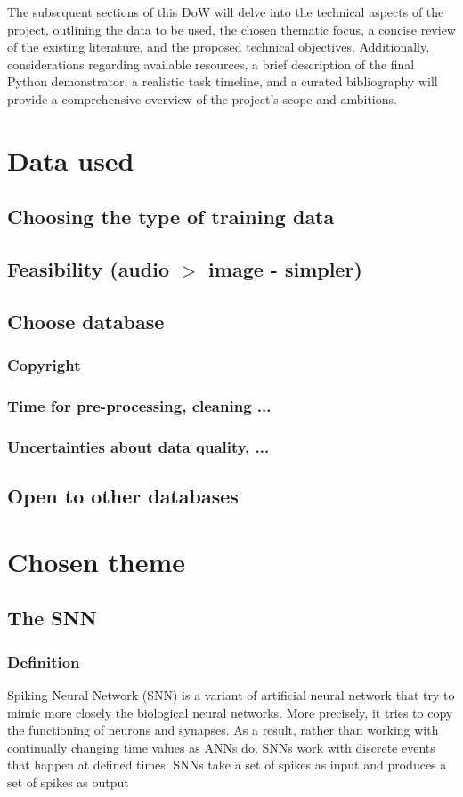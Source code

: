 \documentclass[11pt]{article}
\begin{document}
The subsequent sections of this DoW will delve into the technical aspects of the project, outlining the data to be used, the chosen thematic focus, a concise review of the existing literature, and the proposed technical objectives. Additionally, considerations regarding available resources, a brief description of the final Python demonstrator, a realistic task timeline, and a curated bibliography will provide a comprehensive overview of the project's scope and ambitions.

\section{Data used}
\subsection{Choosing the type of training data}
\subsection{Feasibility (audio $>$ image - simpler)}
\subsection{Choose database}
\subsubsection{Copyright}
\subsubsection{Time for pre-processing, cleaning ...}
\subsubsection{Uncertainties about data quality, ...}
\subsection{Open to other databases}

\section{Chosen theme}
\subsection{The SNN}
\subsubsection{Definition}
Spiking Neural Network (SNN) is a variant of artificial neural network that try to mimic more closely the biological neural networks. More precisely, it tries to copy the functioning of neurons and synapses. As a result, rather than working with continually changing time values as ANNs do, SNNs work with discrete events that happen at defined times. SNNs take a set of spikes as input and produces a set of spikes as output
\end{document}
